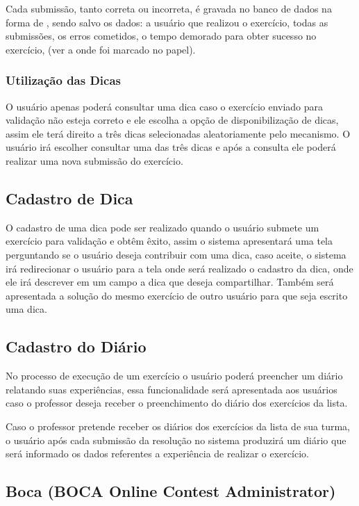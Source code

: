 Cada submissão, tanto correta ou incorreta, é gravada no banco de dados na forma de , sendo salvo os dados: a usuário que realizou o exercício, todas as submissões, os erros cometidos, o tempo demorado para obter sucesso no exercício, (ver a onde foi marcado no papel).


\subsubsection{Utilização das Dicas}

O usuário apenas poderá consultar uma dica caso o exercício enviado para validação não esteja correto e ele escolha a opção de disponibilização de dicas, assim ele terá direito a três dicas selecionadas aleatoriamente pelo mecanismo. O usuário irá escolher consultar uma das três dicas e após a consulta ele poderá realizar uma nova submissão do exercício.

\subsection{Cadastro de Dica}

O cadastro de uma dica pode ser realizado quando o usuário submete um exercício para validação e obtêm êxito, assim o sistema apresentará uma tela perguntando se o usuário deseja contribuir com uma dica, caso aceite, o sistema irá redirecionar o usuário para a tela onde será realizado o cadastro da dica, onde ele irá descrever em um campo a dica que deseja compartilhar. Também será apresentada a solução do mesmo exercício de outro usuário para que seja escrito uma dica. 

\subsection{Cadastro do Diário}

No processo de execução de um exercício o usuário poderá preencher um diário relatando suas experiências, essa funcionalidade será apresentada aos usuários caso o professor deseja receber o preenchimento do diário dos exercícios da lista. 

Caso o professor pretende receber os diários dos exercícios da lista de sua turma, o usuário após cada submissão da resolução no sistema produzirá um diário que será informado os dados referentes a experiência de realizar o exercício. 

\subsection{Boca (BOCA Online Contest Administrator)}

